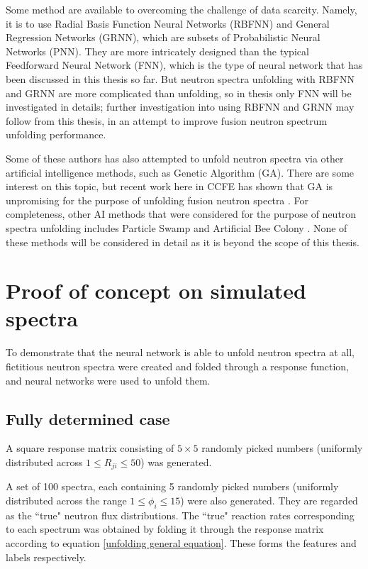 \documentclass[a4paper, 12pt]{article}
\begin{document}
Some method are available to overcoming the challenge of data scarcity. Namely, it is to use Radial Basis Function Neural Networks (RBFNN) and General Regression Networks (GRNN), which are subsets of Probabilistic Neural Networks (PNN). They are more intricately designed than the typical Feedforward Neural Network (FNN), which is the type of neural network that has been discussed in this thesis so far.
But neutron spectra unfolding with RBFNN\cite{RBF-NN}\cite{ThreeAIUnfolding} and GRNN\cite{NNNeutronFluenceAmbientDoseEquivalent}\cite{unfoldingCodeBasedOnGeneralizedRegressionANN}\cite{ThreeAIUnfolding} are more complicated than unfolding, so in thesis only FNN will be investigated in details; further investigation into using RBFNN and GRNN may follow from this thesis, in an attempt to improve fusion neutron spectrum unfolding performance.

Some of these authors\cite{ThreeAIUnfolding} has also attempted to unfold neutron spectra via other artificial intelligence methods, such as Genetic Algorithm (GA). There are some interest on this topic\cite{SVitishaGeneticAlgorithm}\cite{HighResGeneticAlgorithm}, but recent work here in CCFE has shown that GA is unpromising for the purpose of unfolding fusion neutron spectra \cite{R.WorrallThesis}. For completeness, other AI methods that were considered for the purpose of neutron spectra unfolding includes Particle Swamp \cite{ParticleSwamp_NE-213} and Artificial Bee Colony \cite{BeeColony}. None of these methods will be considered in detail as it is beyond the scope of this thesis.

\section{Proof of concept on simulated spectra}
To demonstrate that the neural network is able to unfold neutron spectra at all, fictitious neutron spectra were created and folded through a response function, and neural networks were used to unfold them.

\subsection{Fully determined case}
A square response matrix consisting of $5\times5$ randomly picked numbers (uniformly distributed across $1\le R_{ji}\le50$) was generated.

A set of 100 spectra, each containing 5 randomly picked numbers (uniformly distributed across the range $1\le\phi_i\le15$) were also generated. They are regarded as the ``true" neutron flux distributions. The ``true" reaction rates corresponding to each spectrum was obtained by folding it through the response matrix according to equation \ref{unfolding general equation}. These forms the features and labels respectively.
\end{document}
